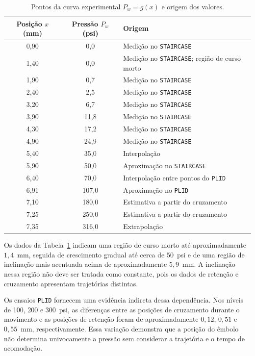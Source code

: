 \begin{table}[htbp]
    \centering
    \caption{Pontos da curva experimental $P_w=g(x)$ e origem dos valores.}
    \label{tab:resultado-final-lut}
    \begin{tabular}{c c l}
        \toprule
        Posição $x$ (mm) & Pressão $P_w$ (psi) & Origem \\
        \midrule
        0,90 & 0,0 & Medição no \texttt{STAIRCASE} \\
        1,40 & 0,0 & Medição no \texttt{STAIRCASE}; região de curso morto \\
        1,90 & 0,7 & Medição no \texttt{STAIRCASE} \\
        2,40 & 2,5 & Medição no \texttt{STAIRCASE} \\
        3,20 & 6,7 & Medição no \texttt{STAIRCASE} \\
        3,90 & 11,8 & Medição no \texttt{STAIRCASE} \\
        4,30 & 17,2 & Medição no \texttt{STAIRCASE} \\
        4,90 & 24,9 & Medição no \texttt{STAIRCASE} \\
        5,40 & 35,0 & Interpolação \\
        5,90 & 50,0 & Aproximação no \texttt{STAIRCASE} \\
        6,40 & 70,0 & Interpolação entre pontos do \texttt{PLID} \\
        6,91 & 107,0 & Aproximação no \texttt{PLID} \\
        7,10 & 180,0 & Estimativa a partir do cruzamento \\
        7,25 & 250,0 & Estimativa a partir do cruzamento \\
        7,35 & 316,0 & Extrapolação \\
        \bottomrule
    \end{tabular}
\end{table}

Os dados da Tabela~\ref{tab:resultado-final-lut} indicam uma região de curso morto até aproximadamente $1,4$~mm, seguida de crescimento gradual até cerca de 50~psi e de uma região de inclinação mais acentuada acima de aproximadamente $5,9$~mm. A inclinação nessa região não deve ser tratada como constante, pois os dados de retenção e cruzamento apresentam trajetórias distintas.

Os ensaios \texttt{PLID} fornecem uma evidência indireta dessa dependência. Nos níveis de 100, 200 e 300~psi, as diferenças entre as posições de cruzamento durante o movimento e as posições de retenção foram de aproximadamente $0,12$, $0,51$ e $0,55$~mm, respectivamente. Essa variação demonstra que a posição do êmbolo não determina univocamente a pressão sem considerar a trajetória e o tempo de acomodação.

